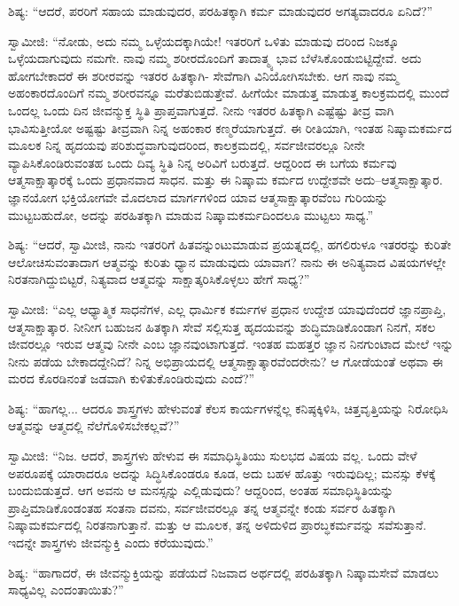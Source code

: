 ಶಿಷ್ಯ: “ಆದರೆ, ಪರರಿಗೆ ಸಹಾಯ ಮಾಡುವುದರ, ಪರಹಿತಕ್ಕಾಗಿ ಕರ್ಮ ಮಾಡುವುದರ ಅಗತ್ಯವಾದರೂ ಏನಿದೆ?”

ಸ್ವಾಮೀಜಿ: “ನೋಡು, ಅದು ನಮ್ಮ ಒಳ್ಳೆಯದಕ್ಕಾಗಿಯೇ! ಇತರರಿಗೆ ಒಳಿತು ಮಾಡುವು ದರಿಂದ ನಿಜಕ್ಕೂ ಒಳ್ಳೆಯದಾಗುವುದು ನಮಗೇ. ನಾವು ನಮ್ಮ ಶರೀರದೊಂದಿಗೆ ತಾದಾತ್ಮ್ಯ ಭಾವ ಬೆಳೆಸಿಕೊಂಡುಬಿಟ್ಟಿದ್ದೇವೆ. ಅದು ಹೋಗಬೇಕಾದರೆ ಈ ಶರೀರವನ್ನು ಇತರರ ಹಿತಕ್ಕಾಗಿ- ಸೇವೆಗಾಗಿ ವಿನಿಯೋಗಿಸಬೇಕು. ಆಗ ನಾವು ನಮ್ಮ ಅಹಂಕಾರದೊಂದಿಗೆ ನಮ್ಮ ಶರೀರವನ್ನೂ ಮರೆತುಬಿಡುತ್ತೇವೆ. ಹೀಗೆಯೇ ಮಾಡುತ್ತ ಮಾಡುತ್ತ ಕಾಲಕ್ರಮದಲ್ಲಿ ಮುಂದೆ ಒಂದಲ್ಲ ಒಂದು ದಿನ ಜೀವನ್ಮುಕ್ತ ಸ್ಥಿತಿ ಪ್ರಾಪ್ತವಾಗುತ್ತದೆ. ನೀನು ಇತರರ ಹಿತಕ್ಕಾಗಿ ಎಷ್ಟೆಷ್ಟು ತೀವ್ರ ವಾಗಿ ಭಾವಿಸುತ್ತೀಯೋ ಅಷ್ಟಷ್ಟು ತೀವ್ರವಾಗಿ ನಿನ್ನ ಅಹಂಕಾರ ಕಣ್ಮರೆಯಾಗುತ್ತದೆ. ಈ ರೀತಿಯಾಗಿ, ಇಂತಹ ನಿಷ್ಕಾಮಕರ್ಮದ ಮೂಲಕ ನಿನ್ನ ಹೃದಯವು ಪರಿಶುದ್ಧವಾಗುವುದರಿಂದ, ಕಾಲಕ್ರಮದಲ್ಲಿ, ಸರ್ವಜೀವರಲ್ಲೂ ನೀನೇ ವ್ಯಾಪಿಸಿಕೊಂಡಿರುವಂತಹ ಒಂದು ದಿವ್ಯ ಸ್ಥಿತಿ ನಿನ್ನ ಅರಿವಿಗೆ ಬರುತ್ತದೆ. ಆದ್ದರಿಂದ ಈ ಬಗೆಯ ಕರ್ಮವು ಆತ್ಮಸಾಕ್ಷಾತ್ಕಾರಕ್ಕೆ ಒಂದು ಪ್ರಧಾನವಾದ ಸಾಧನ. ಮತ್ತು ಈ ನಿಷ್ಕಾಮ ಕರ್ಮದ ಉದ್ದೇಶವೇ ಅದು–ಆತ್ಮಸಾಕ್ಷಾತ್ಕಾರ. ಜ್ಞಾನಯೋಗ ಭಕ್ತಿಯೋಗವೇ ಮೊದಲಾದ ಮಾರ್ಗಗಳಿಂದ ಯಾವ ಆತ್ಮಸಾಕ್ಷಾತ್ಕಾರವೆಂಬ ಗುರಿಯನ್ನು ಮುಟ್ಟಬಹುದೋ, ಅದನ್ನು ಪರಹಿತಕ್ಕಾಗಿ ಮಾಡುವ ನಿಷ್ಕಾಮಕರ್ಮದಿಂದಲೂ ಮುಟ್ಟಲು ಸಾಧ್ಯ.”

ಶಿಷ್ಯ: “ಆದರೆ, ಸ್ವಾಮೀಜಿ, ನಾನು ಇತರರಿಗೆ ಹಿತವನ್ನುಂಟುಮಾಡುವ ಪ್ರಯತ್ನದಲ್ಲಿ, ಹಗಲಿರುಳೂ ಇತರರನ್ನು ಕುರಿತೇ ಆಲೋಚಿಸುವಂತಾದಾಗ ಆತ್ಮವನ್ನು ಕುರಿತು ಧ್ಯಾನ ಮಾಡುವುದು ಯಾವಾಗ? ನಾನು ಈ ಅನಿತ್ಯವಾದ ವಿಷಯಗಳಲ್ಲೇ ನಿರತನಾಗಿದ್ದುಬಿಟ್ಟರೆ, ನಿತ್ಯವಾದ ಆತ್ಮವನ್ನು ಸಾಕ್ಷಾತ್ಕರಿಸಿಕೊಳ್ಳಲು ಹೇಗೆ ಸಾಧ್ಯ?”

ಸ್ವಾಮೀಜಿ: “ಎಲ್ಲ ಆಧ್ಯಾತ್ಮಿಕ ಸಾಧನೆಗಳ, ಎಲ್ಲ ಧಾರ್ಮಿಕ ಕರ್ಮಗಳ ಪ್ರಧಾನ ಉದ್ದೇಶ ಯಾವುದೆಂದರೆ ಜ್ಞಾನಪ್ರಾಪ್ತಿ, ಆತ್ಮಸಾಕ್ಷಾತ್ಕಾರ. ನೀನೀಗ ಬಹುಜನ ಹಿತಕ್ಕಾಗಿ ಸೇವೆ ಸಲ್ಲಿಸುತ್ತ ಹೃದಯವನ್ನು ಶುದ್ಧಿಮಾಡಿಕೊಂಡಾಗ ನಿನಗೆ, ಸಕಲ ಜೀವರಲ್ಲೂ ಇರುವ ಆತ್ಮವು ನೀನೇ ಎಂಬ ಜ್ಞಾನವುಂಟಾಗುತ್ತದೆ. ಇಂತಹ ಮಹತ್ತರ ಜ್ಞಾನ ನಿನಗುಂಟಾದ ಮೇಲೆ ಇನ್ನು ನೀನು ಪಡೆಯ ಬೇಕಾದದ್ದೇನಿದೆ? ನಿನ್ನ ಅಭಿಪ್ರಾಯದಲ್ಲಿ ಆತ್ಮಸಾಕ್ಷಾತ್ಕಾರವೆಂದರೇನು? ಆ ಗೋಡೆಯಂತೆ ಅಥವಾ ಈ ಮರದ ಕೊರಡಿನಂತೆ ಜಡವಾಗಿ ಕುಳಿತುಕೊಂಡಿರುವುದು ಎಂದೆ?”

ಶಿಷ್ಯ: “ಹಾಗಲ್ಲ... ಆದರೂ ಶಾಸ್ತ್ರಗಳು ಹೇಳುವಂತೆ ಕೆಲಸ ಕಾರ್ಯಗಳನ್ನೆಲ್ಲ ಕನಿಷ್ಠಕ್ಕಿಳಿಸಿ, ಚಿತ್ತವೃತ್ತಿಯನ್ನು ನಿರೋಧಿಸಿ ಆತ್ಮವನ್ನು ಆತ್ಮದಲ್ಲಿ ನೆಲೆಗೊಳಿಸಬೇಕಲ್ಲವೆ?”

ಸ್ವಾಮೀಜಿ: “ನಿಜ. ಆದರೆ, ಶಾಸ್ತ್ರಗಳು ಹೇಳುವ ಈ ಸಮಾಧಿಸ್ಥಿತಿಯು ಸುಲಭದ ವಿಷಯ ವಲ್ಲ. ಒಂದು ವೇಳೆ ಅಪರೂಪಕ್ಕೆ ಯಾರಾದರೂ ಅದನ್ನು ಸಿದ್ಧಿಸಿಕೊಂಡರೂ ಕೂಡ, ಅದು ಬಹಳ ಹೊತ್ತು ಇರುವುದಿಲ್ಲ; ಮನಸ್ಸು ಕೆಳಕ್ಕೆ ಬಂದುಬಿಡುತ್ತದೆ. ಆಗ ಅವನು ಆ ಮನಸ್ಸನ್ನು ಎಲ್ಲಿಡುವುದು? ಆದ್ದರಿಂದ, ಅಂತಹ ಸಮಾಧಿಸ್ಥಿತಿಯನ್ನು ಪ್ರಾಪ್ತಿಮಾಡಿಕೊಂಡಂತಹ ಸಂತನಾ ದವನು, ಸರ್ವಜೀವರಲ್ಲೂ ತನ್ನ ಆತ್ಮವನ್ನೇ ಕಂಡು ಸರ್ವರ ಹಿತಕ್ಕಾಗಿ ನಿಷ್ಕಾಮಕರ್ಮದಲ್ಲಿ ನಿರತನಾಗುತ್ತಾನೆ. ಮತ್ತು ಆ ಮೂಲಕ, ತನ್ನ ಅಳಿದುಳಿದ ಪ್ರಾರಬ್ಧಕರ್ಮವನ್ನು ಸವೆಸುತ್ತಾನೆ. ಇದನ್ನೇ ಶಾಸ್ತ್ರಗಳು ಜೀವನ್ಮುಕ್ತಿ ಎಂದು ಕರೆಯುವುದು.”

ಶಿಷ್ಯ: “ಹಾಗಾದರೆ, ಈ ಜೀವನ್ಮುಕ್ತಿಯನ್ನು ಪಡೆಯದೆ ನಿಜವಾದ ಅರ್ಥದಲ್ಲಿ ಪರಹಿತಕ್ಕಾಗಿ ನಿಷ್ಕಾಮಸೇವೆ ಮಾಡಲು ಸಾಧ್ಯವಿಲ್ಲ ಎಂದಂತಾಯಿತು?”

